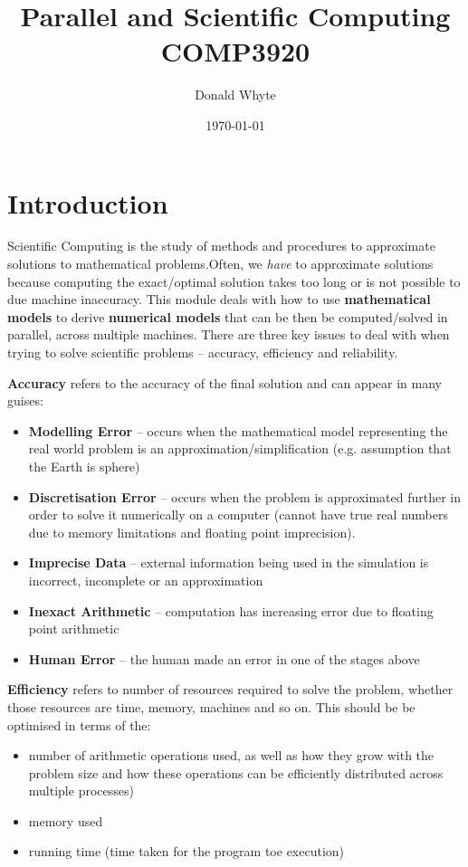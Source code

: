 \documentclass{article}
\title{Parallel and Scientific Computing \\ COMP3920}
\author{Donald Whyte}
\date{\today}
\begin{document}
\maketitle

\tableofcontents

\pagebreak
\listoffigures

\pagebreak
\listoftables

\pagebreak

\section{Introduction}

Scientific Computing is the study of methods and procedures to approximate solutions to mathematical problems.Often, we \textit{have} to approximate solutions because computing the exact/optimal solution takes too long or is not possible to due machine inaccuracy. This module deals with how to use \textbf{mathematical models} to derive \textbf{numerical models} that can be then be computed/solved in parallel, across multiple machines. There are three key issues to deal with when trying to solve scientific problems -- accuracy, efficiency and reliability.

\textbf{Accuracy} refers to the accuracy of the final solution and can appear in many guises:
\begin{itemize}
	\item \textbf{Modelling Error} -- occurs when the mathematical model representing the real world problem is an approximation/simplification (e.g. assumption that the Earth is  sphere)
	\item \textbf{Discretisation Error} -- occurs when the problem is approximated further in order to solve it numerically on a computer (cannot have true real numbers  due to memory limitations and floating point imprecision).
	\item \textbf{Imprecise Data} -- external information being used in the simulation is incorrect, incomplete or an approximation
	\item \textbf{Inexact Arithmetic} -- computation has increasing error due to floating point arithmetic
	\item \textbf{Human Error} -- the human made an error in one of the stages above
\end{itemize}

\textbf{Efficiency} refers to number of resources required to solve the problem, whether those resources are time, memory, machines and so on. This should be be optimised in terms of the:
\begin{itemize}
	\item number of arithmetic operations used, as well as how they grow with the problem size and how these operations can be efficiently distributed across multiple processes)
	\item memory used
	\item running time (time taken for the program toe execution)
\end{itemize}
\end{document}
